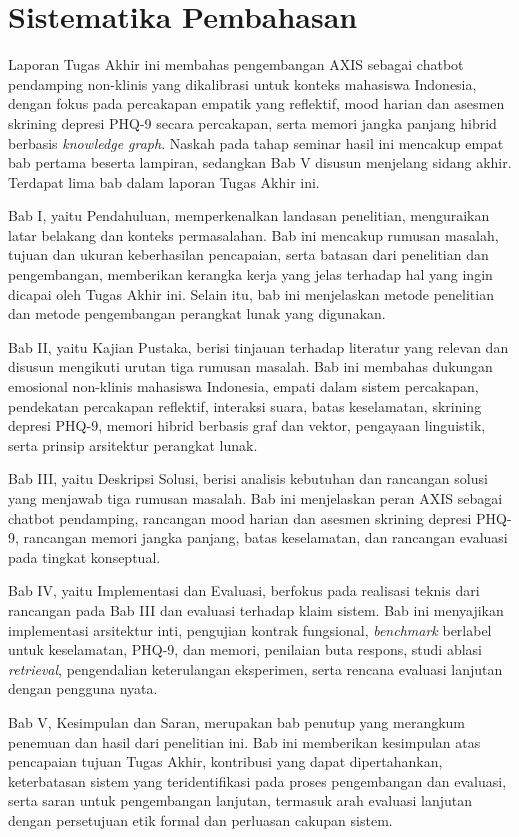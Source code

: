 \section{Sistematika Pembahasan}
\label{sec:sistematika}

Laporan Tugas Akhir ini membahas pengembangan AXIS sebagai chatbot pendamping non-klinis yang dikalibrasi untuk konteks mahasiswa Indonesia, dengan fokus pada percakapan empatik yang reflektif, mood harian dan asesmen skrining depresi PHQ-9 secara percakapan, serta memori jangka panjang hibrid berbasis \textit{knowledge graph}. \ifdefined\seminarhasilmode Naskah pada tahap seminar hasil ini mencakup empat bab pertama beserta lampiran, sedangkan Bab V disusun menjelang sidang akhir. \else Terdapat lima bab dalam laporan Tugas Akhir ini. \fi

Bab I, yaitu Pendahuluan, memperkenalkan landasan penelitian, menguraikan latar belakang dan konteks permasalahan. Bab ini mencakup rumusan masalah, tujuan dan ukuran keberhasilan pencapaian, serta batasan dari penelitian dan pengembangan, memberikan kerangka kerja yang jelas terhadap hal yang ingin dicapai oleh Tugas Akhir ini. Selain itu, bab ini menjelaskan metode penelitian dan metode pengembangan perangkat lunak yang digunakan.

Bab II, yaitu Kajian Pustaka, berisi tinjauan terhadap literatur yang relevan dan disusun mengikuti urutan tiga rumusan masalah. Bab ini membahas dukungan emosional non-klinis mahasiswa Indonesia, empati dalam sistem percakapan, pendekatan percakapan reflektif, interaksi suara, batas keselamatan, skrining depresi PHQ-9, memori hibrid berbasis graf dan vektor, pengayaan linguistik, serta prinsip arsitektur perangkat lunak.

Bab III, yaitu Deskripsi Solusi, berisi analisis kebutuhan dan rancangan solusi yang menjawab tiga rumusan masalah. Bab ini menjelaskan peran AXIS sebagai chatbot pendamping, rancangan mood harian dan asesmen skrining depresi PHQ-9, rancangan memori jangka panjang, batas keselamatan, dan rancangan evaluasi pada tingkat konseptual.

Bab IV, yaitu Implementasi dan Evaluasi, berfokus pada realisasi teknis dari rancangan pada Bab III dan evaluasi terhadap klaim sistem. Bab ini menyajikan implementasi arsitektur inti, pengujian kontrak fungsional, \textit{benchmark} berlabel untuk keselamatan, PHQ-9, dan memori, penilaian buta respons, studi ablasi \textit{retrieval}, pengendalian keterulangan eksperimen, serta rencana evaluasi lanjutan dengan pengguna nyata.

\ifdefined\seminarhasilmode\else
Bab V, Kesimpulan dan Saran, merupakan bab penutup yang merangkum penemuan dan hasil dari penelitian ini. Bab ini memberikan kesimpulan atas pencapaian tujuan Tugas Akhir, kontribusi yang dapat dipertahankan, keterbatasan sistem yang teridentifikasi pada proses pengembangan dan evaluasi, serta saran untuk pengembangan lanjutan, termasuk arah evaluasi lanjutan dengan persetujuan etik formal dan perluasan cakupan sistem.
\fi
